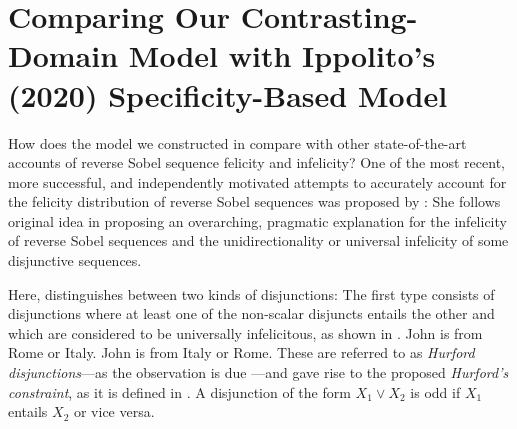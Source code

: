 \chapter{Comparing Our Contrasting-Domain Model with Ippolito's (2020) Specificity-Based Model}
How does the model we constructed in  compare with other state-of-the-art accounts of reverse Sobel sequence felicity and infelicity? One of the most recent, more successful, and independently motivated attempts to accurately account for the felicity distribution of reverse Sobel sequences was proposed by \textcite{Ippolito2020}: She follows  original idea in proposing an overarching, pragmatic explanation for the infelicity of reverse Sobel sequences and the unidirectionality or universal infelicity of some disjunctive sequences.

Here, \textcite{Ippolito2020} distinguishes between two kinds of disjunctions: The first type consists of disjunctions where at least one of the non-scalar disjuncts entails the other and which are considered to be universally infelicitous, as shown in .
\pex[nopreamble=true]\label{ex:hurford}
\a{}\ljudge{\#}John is from Rome or Italy.
\a{}\ljudge{\#}John is from Italy or Rome.
\xe
These are referred to as \textit{Hurford disjunctions}---as the observation is due \textcite{Hurford1974}---and gave rise to the proposed \textit{Hurford's constraint}, as it is defined in .
\ex{}
{}
A disjunction of the form $X_1\lor X_2$ is odd if $X_1$ entails $X_2$ or vice versa.\\\emptyfill\parencite[p. 202]{Katzir2014}
\xe

